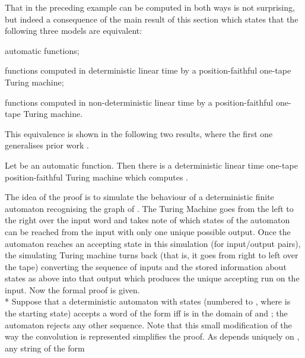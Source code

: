 \documentclass{LMCS}
\theoremstyle{plain}\newtheorem{athm}[thm]{Theorem}
\theoremstyle{plain}\newtheorem{aprop}[thm]{Proposition}
\theoremstyle{plain}\newtheorem{aprob}[thm]{Open Problem}
\theoremstyle{plain}\newtheorem{acor}[thm]{Corollary}
\theoremstyle{plain}\newtheorem{alem}[thm]{Lemma}
\theoremstyle{definition}\newtheorem{adefn}[thm]{Definition}
\theoremstyle{definition}\newtheorem{arem}[thm]{Remark}
\theoremstyle{plain}\newtheorem{aexmp}[thm]{Example}
\theoremstyle{plain}\newtheorem{aclm}[thm]{Claim}
\def\sp{\\*\indent}
\begin{document}
\noindent
That  in the preceding example can be computed in both ways
is not surprising, but indeed a consequence of the main result
of this section which states that the following three
models are equivalent:
\begin{iteMize}{}
\item automatic functions;
\item functions computed in deterministic linear time by a position-faithful
      one-tape Turing machine;
\item functions computed in non-deterministic linear time by a
      position-faithful one-tape Turing machine.
\end{iteMize}
This equivalence is shown in the following two results, where the first
one generalises prior work \cite[Remark 2]{CJLOSS11}.

\begin{thm} \label{th:islinear}
Let  be an automatic function. Then there is a deterministic linear time
one-tape position-faithful Turing machine which computes .
\end{thm}

\proof
The idea of the proof is to simulate the behaviour of a deterministic
finite automaton recognising the graph of . The Turing Machine
goes from the left to the right over the input word and takes note of which
states of the automaton can be reached from the input with only one unique 
possible output.
Once the automaton reaches an accepting state in this simulation
(for input/output pairs), the simulating Turing machine turns back (that
is, it goes from right to left over the tape) 
converting the sequence of inputs and the stored information about 
states as above into that output which produces the unique accepting run 
on the input. Now the formal proof is given.
\sp
Suppose that a deterministic automaton with  states (numbered 
to , where  is the starting state) accepts a word
of the form  iff 
is in the domain of  and ; the automaton rejects
any other sequence. Note that this small modification of the
way the convolution is represented simplifies the proof.
As  depends uniquely on , any string of the form
 
\end{document}
